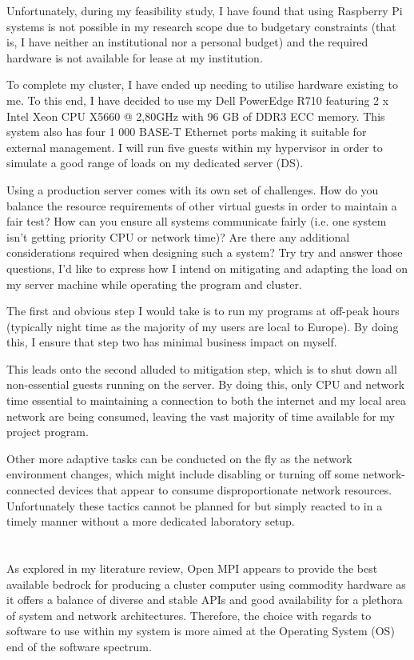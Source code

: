 Unfortunately, during my feasibility study, I have found that using Raspberry Pi systems is not possible in my research scope due to budgetary constraints (that is, I have neither an institutional nor a personal budget) and the required hardware is not available for lease at my institution.

\textbf{}

To complete my cluster, I have ended up needing to utilise hardware existing to me. To this end, I have decided to use my Dell PowerEdge R710 featuring 2 x Intel Xeon CPU X5660 @ 2,80GHz with 96 GB of DDR3 ECC memory. This system also has four 1 000 BASE-T Ethernet ports making it suitable for external management. I will run five guests within my hypervisor in order to simulate a good range of loads on my dedicated server (DS).

Using a production server comes with its own set of challenges. How do you balance the resource requirements of other virtual guests in order to maintain a fair test? How can you ensure all systems communicate fairly (i.e. one system isn't getting priority CPU or network time)? Are there any additional considerations required when designing such a system? Try try and answer those questions, I'd like to express how I intend on mitigating and adapting the load on my server machine while operating the program and cluster.

The first and obvious step I would take is to run my programs at off-peak hours (typically night time as the majority of my users are local to Europe). By doing this, I ensure that step two has minimal business impact on myself.

This leads onto the second alluded to mitigation step, which is to shut down all non-essential guests running on the server. By doing this, only CPU and network time essential to maintaining a connection to both the internet and my local area network are being consumed, leaving the vast majority of time available for my project program.

Other more adaptive tasks can be conducted on the fly as the network environment changes, which might include disabling or turning off some network-connected devices that appear to consume disproportionate network resources. Unfortunately these tactics cannot be planned for but simply reacted to in a timely manner without a more dedicated laboratory setup.

\section{}
As explored in my literature review, Open MPI appears to provide the best available bedrock for producing a cluster computer using commodity hardware as it offers a balance of diverse and stable APIs and good availability for a plethora of system and network architectures. Therefore, the choice with regards to software to use within my system is more aimed at the Operating System (OS) end of the software spectrum.

